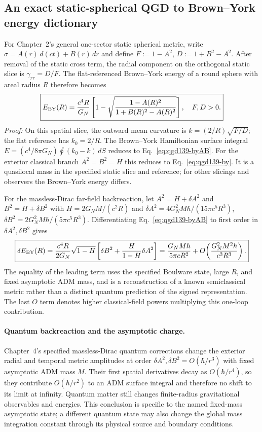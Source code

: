 \documentclass[11pt,a4paper]{article}
\begin{document}
\subsection{An exact static-spherical QGD to Brown--York energy dictionary}
\label{sec:qgd139-by-general}
For Chapter~2's general one-sector static spherical metric, write
$\sigma=A(r)\,d(ct)+B(r)\,dr$ and define
$F:=1-A^2$, $D:=1+B^2-A^2$. After removal of the static cross term,
the radial component on the orthogonal static slice is
$\gamma_{rr}=D/F$. The flat-referenced Brown--York energy of a
round sphere with areal radius $R$ therefore becomes
\begin{equation}\label{eq:qgd139-byAB}
\boxed{E_{\rm BY}(R)=\frac{c^4R}{G_N}\left[
1-\sqrt{\frac{1-A(R)^2}{1+B(R)^2-A(R)^2}}\right],
\quad F,D>0.}
\end{equation}
\emph{Proof:} On this spatial slice, the outward mean curvature is
$k=(2/R)\sqrt{F/D}$; the flat reference has $k_0=2/R$.
The Brown--York Hamiltonian surface integral
$E=(c^4/8\pi G_N)\oint(k_0-k)\,dS$
reduces to Eq.~\eqref{eq:qgd139-byAB}. For the exterior classical
branch $A^2=B^2=H$ this reduces to Eq.~\eqref{eq:qgd139-by}.
It is a quasilocal mass in the specified static slice and reference;
for other slicings and observers the Brown--York energy differs.

For the massless-Dirac far-field backreaction, let
$A^2=H+\delta A^2$ and $B^2=H+\delta B^2$ with
$H=2G_NM/(c^2R)$ and
$\delta A^2=4G_N^2M\hbar/(15\pi c^5R^3)$,
$\delta B^2=2G_N^2M\hbar/(5\pi c^5R^3)$.
Differentiating Eq.~\eqref{eq:qgd139-byAB} to first order in
$\delta A^2,\delta B^2$ gives
\begin{equation}\label{eq:qgd139-byQ}
\boxed{\delta E_{\rm BY}(R)=\frac{c^4R}{2G_N}
\sqrt{1-H}\left[\delta B^2+\frac{H}{1-H}\delta A^2\right]
=\frac{G_NM\hbar}{5\pi cR^2}
+O\!\left(\frac{G_N^2M^2\hbar}{c^3R^3}\right).}
\end{equation}
The equality of the leading term uses the specified Boulware state,
large $R$, and fixed asymptotic ADM mass, and is a reconstruction
of a known semiclassical metric rather than a distinct quantum
prediction of the signed representation. The last $O$ term denotes
higher classical-field powers multiplying this one-loop contribution.

\paragraph{Quantum backreaction and the asymptotic charge.}
Chapter~4's specified massless-Dirac quantum corrections change the
exterior radial and temporal metric amplitudes at order
$\delta A^2,\delta B^2=O(\hbar/r^3)$ with fixed asymptotic ADM
mass $M$. Their first spatial derivatives decay as $O(\hbar/r^4)$,
so they contribute $O(\hbar/r^2)$ to an ADM surface integral and
therefore no shift to its limit at infinity. Quantum matter still
changes finite-radius gravitational observables and energies.
This conclusion is specific to the named fixed-mass asymptotic state;
a different quantum state may also change the global mass integration
constant through its physical source and boundary conditions.
\end{document}
